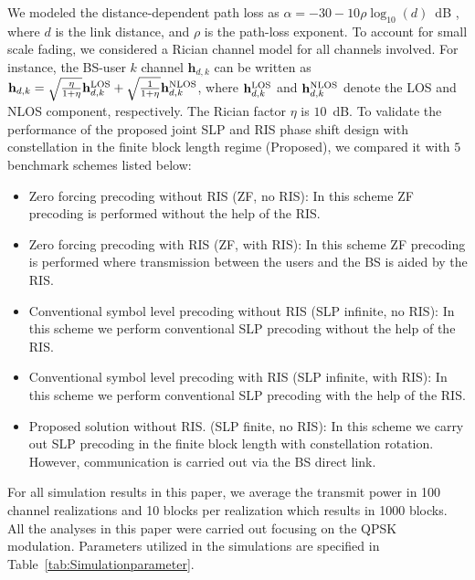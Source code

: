 \documentclass[10pt,conference]{IEEEtran}
\newcommand{\bfh}{\mathbf{h}}
\begin{document}
We modeled the distance-dependent
path loss as $\alpha=-30-10\rho\log_{10}(d)$~dB \cite{9110587}, where $d$ 
is the link distance, and $\rho$ is the path-loss exponent. To account for small scale fading, we considered a Rician channel model for all channels involved. For instance, the BS-user $k$ channel $\bfh_{d,k}$ can be written as $\bfh_{d,k}=\sqrt{\frac{\eta}{1+\eta}}\bfh_{d,k}^{\rm LOS}+\sqrt{\frac{1}{1+\eta}}\bfh_{d,k}^{\rm NLOS}$, where $\bfh_{d,k}^{\rm LOS}$ and $\bfh_{d,k}^{\rm NLOS}$ denote the LOS and NLOS component, respectively. The Rician factor $\eta$ is $10$~dB. To validate the performance of the  proposed joint SLP and RIS phase shift design with constellation in the finite block length regime (Proposed), we compared it with $5$ benchmark schemes listed below:
\begin{itemize}
    \item Zero forcing precoding without RIS (ZF, no RIS): In this scheme ZF precoding is performed without the help of the RIS.
    \item Zero forcing precoding with RIS (ZF, with RIS): In this scheme ZF precoding is performed where transmission between the users and the BS is aided by the RIS.
    \item Conventional symbol level precoding without RIS (SLP infinite, no RIS): In this scheme we perform conventional SLP precoding without the help of the RIS.
    \item Conventional symbol level precoding with RIS (SLP infinite, with RIS): In this scheme we perform conventional SLP precoding with the help of the RIS.
    \item Proposed solution without RIS. (SLP finite, no RIS): In this scheme we carry out SLP precoding in the finite block length with constellation rotation. However, communication is carried out via the BS direct link.
\end{itemize}
For all simulation results in this paper, we average the transmit power in 100 channel realizations and 10 blocks per realization which results in 1000 blocks. All the analyses in this paper were carried out focusing on the QPSK modulation. Parameters utilized in the simulations are specified in Table~\ref{tab:Simulationparameter}.
\end{document}
